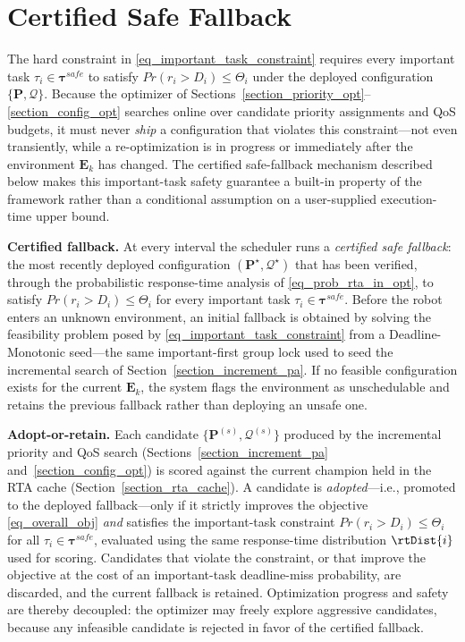 	\section{Certified Safe Fallback}
	\label{section_safety_fallback}

    The hard constraint in \eqref{eq_important_task_constraint} requires every important task $\tau_i \in \boldsymbol{\tau}^{safe}$ to satisfy $Pr(r_i > D_i) \leq \Theta_i$ under the deployed configuration $\{\boldsymbol{P}, \boldsymbol{\mathcal{Q}}\}$.
    Because the optimizer of Sections~\ref{section_priority_opt}--\ref{section_config_opt} searches online over candidate priority assignments and QoS budgets, it must never \emph{ship} a configuration that violates this constraint---not even transiently, while a re-optimization is in progress or immediately after the environment $\textbf{E}_k$ has changed.
    The certified safe-fallback mechanism described below makes this important-task safety guarantee a built-in property of the framework rather than a conditional assumption on a user-supplied execution-time upper bound.

    \textbf{Certified fallback.}
    At every interval the scheduler runs a \emph{certified safe fallback}: the most recently deployed configuration $(\boldsymbol{P}^{\star},\boldsymbol{\mathcal{Q}}^{\star})$ that has been verified, through the probabilistic response-time analysis of \eqref{eq_prob_rta_in_opt}, to satisfy $Pr(r_i > D_i) \leq \Theta_i$ for every important task $\tau_i \in \boldsymbol{\tau}^{safe}$.
    Before the robot enters an unknown environment, an initial fallback is obtained by solving the feasibility problem posed by \eqref{eq_important_task_constraint} from a Deadline-Monotonic seed---the same important-first group lock used to seed the incremental search of Section~\ref{section_increment_pa}.
    If no feasible configuration exists for the current $\textbf{E}_k$, the system flags the environment as unschedulable and retains the previous fallback rather than deploying an unsafe one.

    \textbf{Adopt-or-retain.}
    Each candidate $\{\boldsymbol{P}^{(s)},\boldsymbol{\mathcal{Q}}^{(s)}\}$ produced by the incremental priority and QoS search (Sections~\ref{section_increment_pa} and~\ref{section_config_opt}) is scored against the current champion held in the RTA cache (Section~\ref{section_rta_cache}).
    A candidate is \emph{adopted}---i.e., promoted to the deployed fallback---only if it strictly improves the objective \eqref{eq_overall_obj} \emph{and} satisfies the important-task constraint $Pr(r_i > D_i) \leq \Theta_i$ for all $\tau_i \in \boldsymbol{\tau}^{safe}$, evaluated using the same response-time distribution $\rtDist{i}$ used for scoring.
    Candidates that violate the constraint, or that improve the objective at the cost of an important-task deadline-miss probability, are discarded, and the current fallback is retained.
    Optimization progress and safety are thereby decoupled: the optimizer may freely explore aggressive candidates, because any infeasible candidate is rejected in favor of the certified fallback.

